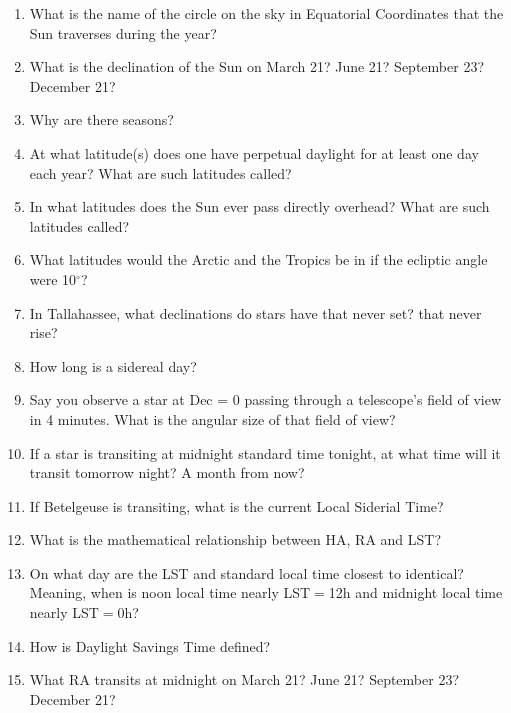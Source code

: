 
\begin{enumerate}
\item  What is the name of the circle on the sky in Equatorial
  Coordinates that the Sun traverses during the year?
\vspace{80pt}
\item  What is the declination of the Sun on March 21? June 21?
  September 23? December 21?
\vspace{80pt}
\item Why are there seasons?
\vspace{80pt}
\item At what latitude(s) does one have perpetual daylight for at least
  one day each year? What are such latitudes called?
\vspace{80pt}
\item In what latitudes does the Sun ever pass directly overhead? What
  are such latitudes called?
\vspace{80pt}
\item What latitudes would the Arctic and the Tropics be in if the
  ecliptic angle were 10$^\circ$?
\vspace{80pt}
\item In Tallahassee, what declinations do stars have that never set?
  that never rise?
\vspace{80pt}
\item How long is a sidereal day?
\vspace{80pt}
\item Say you observe a star at Dec = 0 passing through a telescope's
  field of view in 4 minutes. What is the angular size of that field
  of view?
\vspace{80pt}
\item If a star is transiting at midnight standard time tonight, at
  what time will it transit tomorrow night? A month from now?
\vspace{80pt}
\item If Betelgeuse is transiting, what is the current Local Siderial
  Time?
\vspace{80pt}
\item What is the mathematical relationship between HA, RA and LST?
\vspace{80pt}
\item On what day are the LST and standard local time closest to 
  identical? Meaning, when is noon local time nearly LST$=$12h and
  midnight local time nearly LST$=$0h?
\vspace{80pt}
\item How is Daylight Savings Time defined?
\vspace{80pt}
\item What RA transits at midnight on March 21? June 21? September 23?
  December 21?
\vspace{80pt}
\end{enumerate}
